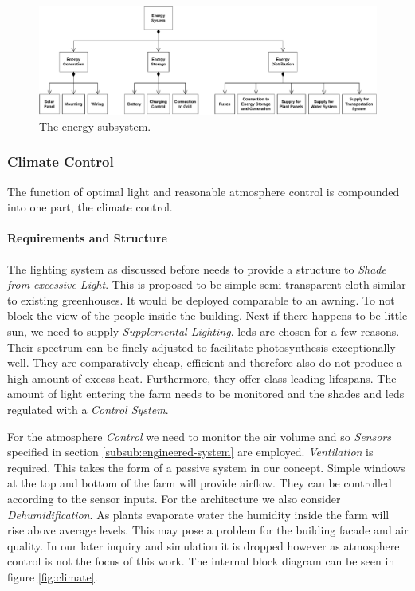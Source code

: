 \begin{figure}[htbp]
  \centering
  \includegraphics[width=\textwidth]{img/architecture/energy.pdf}
  \caption{The energy subsystem.}
  \label{fig:energy}
\end{figure}

\subsubsection{Climate Control}
\label{subsub:climate-control}
The function of optimal light and reasonable atmosphere control is compounded into one part, the climate control.
\paragraph{Requirements and Structure}
The lighting system as discussed before needs to provide a structure to \textit{Shade from excessive Light}.
This is proposed to be simple semi-transparent cloth similar to existing greenhouses.
It would be deployed comparable to an awning.
To not block the view of the people inside the building.
Next if there happens to be little sun, we need to supply \textit{Supplemental Lighting}.
\acp{led} are chosen for a few reasons.
Their spectrum can be finely adjusted to facilitate photosynthesis exceptionally well.
They are comparatively cheap, efficient and therefore also do not produce a high amount of excess heat.
Furthermore, they offer class leading lifespans.
The amount of light entering the farm needs to be monitored and the shades and \acp{led} regulated with a \textit{Control System}.

For the atmosphere \textit{Control} we need to monitor the air volume and so \textit{Sensors} specified in section \ref{subsub:engineered-system} are employed.
\textit{Ventilation} is required.
This takes the form of a passive system in our concept.
Simple windows at the top and bottom of the farm will provide airflow.
They can be controlled according to the sensor inputs.
For the architecture we also consider \textit{Dehumidification}.
As plants evaporate water the humidity inside the farm will rise above average levels.
This may pose a problem for the building facade and air quality.
In our later inquiry and simulation it is dropped however as atmosphere control is not the focus of this work.
The internal block diagram can be seen in figure \ref{fig:climate}.

